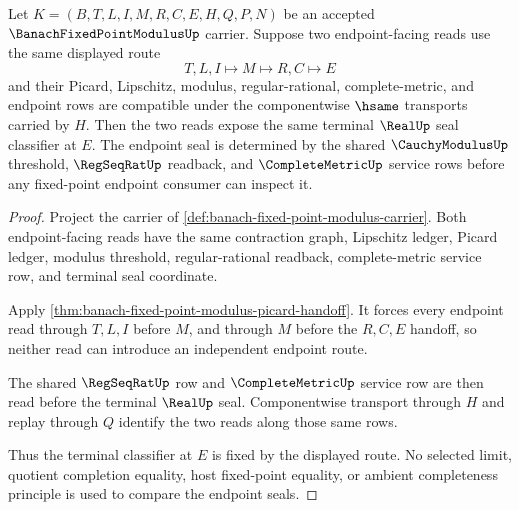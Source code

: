 \begin{theorem}
\label{thm:banach-fixed-point-modulus-endpoint-seal-determinacy}
Let $K=(B,T,L,I,M,R,C,E,H,Q,P,N)$ be an accepted $\BanachFixedPointModulusUp$ carrier. Suppose two endpoint-facing reads use the same displayed route
$$
T,L,I\longmapsto M\longmapsto R,C\longmapsto E
$$
and their Picard, Lipschitz, modulus, regular-rational, complete-metric, and endpoint rows are compatible under the componentwise $\hsame$ transports carried by $H$. Then the two reads expose the same terminal $\RealUp$ seal classifier at $E$. The endpoint seal is determined by the shared $\CauchyModulusUp$ threshold, $\RegSeqRatUp$ readback, and $\CompleteMetricUp$ service rows before any fixed-point endpoint consumer can inspect it.
\end{theorem}
\begin{proof}
Project the carrier of \autoref{def:banach-fixed-point-modulus-carrier}. Both endpoint-facing reads have the same contraction graph, Lipschitz ledger, Picard ledger, modulus threshold, regular-rational readback, complete-metric service row, and terminal seal coordinate.

Apply \autoref{thm:banach-fixed-point-modulus-picard-handoff}. It forces every endpoint read through $T,L,I$ before $M$, and through $M$ before the $R,C,E$ handoff, so neither read can introduce an independent endpoint route.

The shared $\RegSeqRatUp$ row and $\CompleteMetricUp$ service row are then read before the terminal $\RealUp$ seal. Componentwise transport through $H$ and replay through $Q$ identify the two reads along those same rows.

Thus the terminal classifier at $E$ is fixed by the displayed route. No selected limit, quotient completion equality, host fixed-point equality, or ambient completeness principle is used to compare the endpoint seals.
\end{proof}



